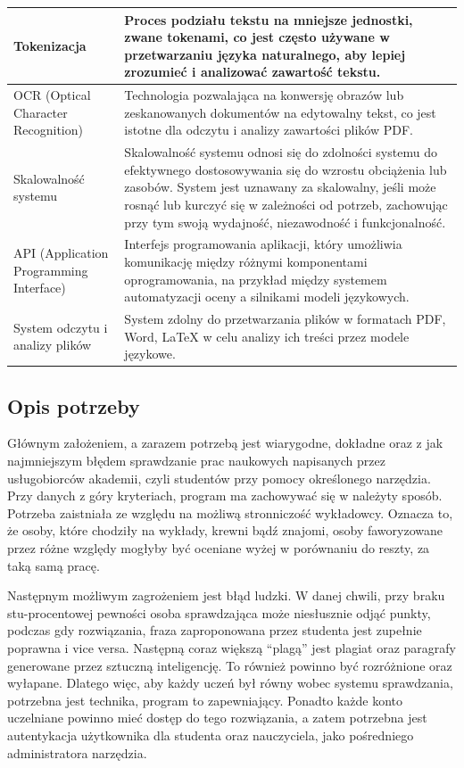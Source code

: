 \documentclass[a4paper, 12pt]{article}
\begin{document}
\begin{longtable}{|p{}|p{}|}
\hline
Tokenizacja & Proces podziału tekstu na mniejsze jednostki, zwane tokenami, co jest często używane w przetwarzaniu języka naturalnego, aby lepiej zrozumieć i analizować zawartość tekstu. \\
\hline
OCR (Optical Character Recognition) & Technologia pozwalająca na konwersję obrazów lub zeskanowanych dokumentów na edytowalny tekst, co jest istotne dla odczytu i analizy zawartości plików PDF. \\
\hline
Skalowalność systemu & Skalowalność systemu odnosi się do zdolności systemu do efektywnego dostosowywania się do wzrostu obciążenia lub zasobów. System jest uznawany za skalowalny, jeśli może rosnąć lub kurczyć się w zależności od potrzeb, zachowując przy tym swoją wydajność, niezawodność i funkcjonalność. \\
\hline
API (Application Programming Interface) & Interfejs programowania aplikacji, który umożliwia komunikację między różnymi komponentami oprogramowania, na przykład między systemem automatyzacji oceny a silnikami modeli językowych. \\
\hline
System odczytu i analizy plików & System zdolny do przetwarzania plików w formatach PDF, Word, LaTeX w celu analizy ich treści przez modele językowe. \\
\hline
\end{longtable}

\subsection{Opis potrzeby}
Głównym założeniem, a zarazem potrzebą jest wiarygodne, dokładne oraz z jak najmniejszym błędem sprawdzanie prac naukowych napisanych przez usługobiorców akademii, czyli studentów przy pomocy określonego narzędzia.
Przy danych z góry kryteriach, program ma zachowywać się w należyty sposób.
Potrzeba zaistniała ze względu na możliwą stronniczość wykładowcy.
Oznacza to, że osoby, które chodziły na wykłady, krewni bądź znajomi, osoby faworyzowane przez różne względy mogłyby być oceniane wyżej w porównaniu do reszty, za taką samą pracę.

Następnym możliwym zagrożeniem jest błąd ludzki. W danej chwili, przy braku stu-procentowej pewności osoba sprawdzająca może niesłusznie odjąć punkty, podczas gdy rozwiązania, fraza zaproponowana przez studenta jest zupełnie poprawna i vice versa.
Następną coraz większą “plagą” jest plagiat oraz paragrafy generowane przez sztuczną inteligencję.
To również powinno być rozróżnione oraz wyłapane. Dlatego więc, aby każdy uczeń był równy wobec systemu sprawdzania, potrzebna jest technika, program to zapewniający.
Ponadto każde konto uczelniane powinno mieć dostęp do tego rozwiązania, a zatem potrzebna jest autentykacja użytkownika dla studenta oraz nauczyciela, jako pośredniego administratora narzędzia.
\end{document}
